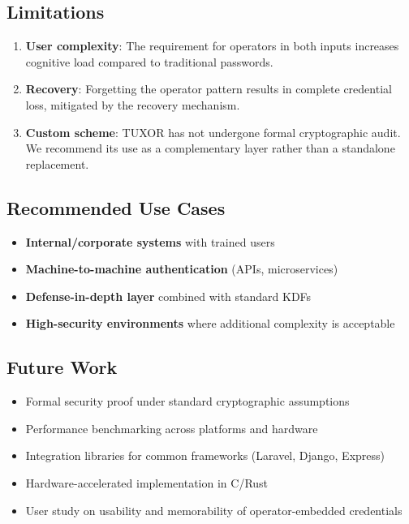 \documentclass[11pt,a4paper]{article}
\begin{document}
\subsection{Limitations}

\begin{enumerate}[noitemsep]
  \item \textbf{User complexity}: The requirement for operators in both inputs increases cognitive load compared to traditional passwords.
  \item \textbf{Recovery}: Forgetting the operator pattern results in complete credential loss, mitigated by the recovery mechanism.
  \item \textbf{Custom scheme}: TUXOR has not undergone formal cryptographic audit. We recommend its use as a complementary layer rather than a standalone replacement.
\end{enumerate}

\subsection{Recommended Use Cases}

\begin{itemize}[noitemsep]
  \item \textbf{Internal/corporate systems} with trained users
  \item \textbf{Machine-to-machine authentication} (APIs, microservices)
  \item \textbf{Defense-in-depth layer} combined with standard KDFs
  \item \textbf{High-security environments} where additional complexity is acceptable
\end{itemize}

\subsection{Future Work}

\begin{itemize}[noitemsep]
  \item Formal security proof under standard cryptographic assumptions
  \item Performance benchmarking across platforms and hardware
  \item Integration libraries for common frameworks (Laravel, Django, Express)
  \item Hardware-accelerated implementation in C/Rust
  \item User study on usability and memorability of operator-embedded credentials
\end{itemize}
\end{document}
